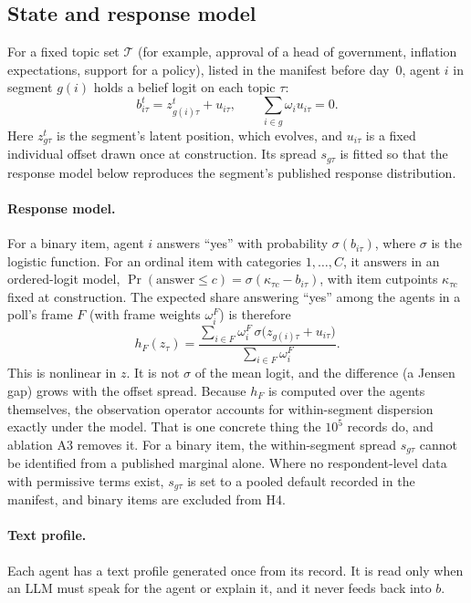 \documentclass[11pt]{article}
\begin{document}
\subsection{State and response model}\label{sec:state}
For a fixed topic set $\mathcal{T}$ (for example, approval of a head of government, inflation expectations, support for a policy), listed in the manifest before day~0, agent $i$ in segment $g(i)$ holds a belief logit on each topic $\tau$:
\begin{equation}\label{eq:agent}
b_{i\tau}^{t} = z_{g(i)\tau}^{t} + u_{i\tau},\qquad \textstyle\sum_{i\in g}\omega_i u_{i\tau}=0 .
\end{equation}
Here $z_{g\tau}^t$ is the segment's latent position, which evolves, and $u_{i\tau}$ is a fixed individual offset drawn once at construction. Its spread $s_{g\tau}$ is fitted so that the response model below reproduces the segment's published response distribution.

\paragraph{Response model.} For a binary item, agent $i$ answers ``yes'' with probability $\sigma(b_{i\tau})$, where $\sigma$ is the logistic function. For an ordinal item with categories $1,\dots,C$, it answers in an ordered-logit model, $\Pr(\text{answer}\le c)=\sigma(\kappa_{\tau c}-b_{i\tau})$, with item cutpoints $\kappa_{\tau c}$ fixed at construction. The expected share answering ``yes'' among the agents in a poll's frame $F$ (with frame weights $\omega_i^F$) is therefore
\begin{equation}\label{eq:obsop}
h_F(z_\tau)=\frac{\sum_{i\in F}\omega_i^F\,\sigma\!\big(z_{g(i)\tau}+u_{i\tau}\big)}{\sum_{i\in F}\omega_i^F}.
\end{equation}
This is nonlinear in $z$. It is not $\sigma$ of the mean logit, and the difference (a Jensen gap) grows with the offset spread. Because $h_F$ is computed over the agents themselves, the observation operator accounts for within-segment dispersion exactly under the model. That is one concrete thing the $10^5$ records do, and ablation A3 removes it. For a binary item, the within-segment spread $s_{g\tau}$ cannot be identified from a published marginal alone. Where no respondent-level data with permissive terms exist, $s_{g\tau}$ is set to a pooled default recorded in the manifest, and binary items are excluded from H4.

\paragraph{Text profile.} Each agent has a text profile generated once from its record. It is read only when an LLM must speak for the agent or explain it, and it never feeds back into $b$.
\end{document}
